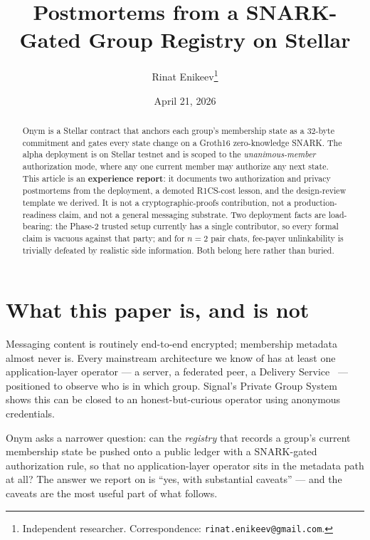 \documentclass[11pt,a4paper]{article}
\begin{document}
\title{Postmortems from a SNARK-Gated Group Registry on Stellar}
\author{Rinat Enikeev\thanks{Independent researcher. Correspondence: \texttt{rinat.enikeev@gmail.com}.}}
\date{April 21, 2026}
\maketitle

\begin{abstract}
Onym is a Stellar contract that anchors each group's membership state as a 32-byte commitment and gates every state change on a Groth16 zero-knowledge SNARK. The alpha deployment is on Stellar testnet and is scoped to the \emph{unanimous-member} authorization mode, where any one current member may authorize any next state. This article is an \textbf{experience report}: it documents two authorization and privacy postmortems from the deployment, a demoted R1CS-cost lesson, and the design-review template we derived. It is not a cryptographic-proofs contribution, not a production-readiness claim, and not a general messaging substrate. Two deployment facts are load-bearing: the Phase-2 trusted setup currently has a single contributor, so every formal claim is vacuous against that party; and for $n=2$ pair chats, fee-payer unlinkability is trivially defeated by realistic side information. Both belong here rather than buried.
\end{abstract}

\section{What this paper is, and is not}

Messaging content is routinely end-to-end encrypted; membership metadata almost never is. Every mainstream architecture we know of has at least one application-layer operator --- a server, a federated peer, a Delivery Service~\cite{rfc9420} --- positioned to observe who is in which group. Signal's Private Group System~\cite{chase2020} shows this can be closed to an honest-but-curious operator using anonymous credentials.

Onym asks a narrower question: can the \emph{registry} that records a group's current membership state be pushed onto a public ledger with a SNARK-gated authorization rule, so that no application-layer operator sits in the metadata path at all? The answer we report on is ``yes, with substantial caveats'' --- and the caveats are the most useful part of what follows.
\end{document}
